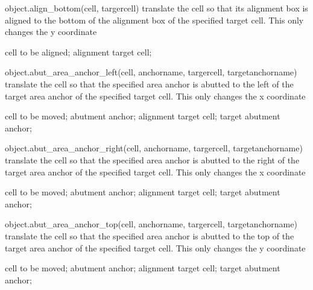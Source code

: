 \begin{APIfunc}{object.align\_bottom(cell, targercell)}
    translate the cell so that its alignment box is aligned to the bottom of the alignment box of the specified target cell. This only changes the y coordinate
    \begin{APIparameters}
            cell to be aligned;
            alignment target cell;
    \end{APIparameters}
\end{APIfunc}
\begin{APIfunc}{object.abut\_area\_anchor\_left(cell, anchorname, targercell, targetanchorname)}
    translate the cell so that the specified area anchor is abutted to the left of the target area anchor of the specified target cell. This only changes the x coordinate
    \begin{APIparameters}
            cell to be moved;
            abutment anchor;
            alignment target cell;
            target abutment anchor;
    \end{APIparameters}
\end{APIfunc}
\begin{APIfunc}{object.abut\_area\_anchor\_right(cell, anchorname, targercell, targetanchorname)}
    translate the cell so that the specified area anchor is abutted to the right of the target area anchor of the specified target cell. This only changes the x coordinate
    \begin{APIparameters}
            cell to be moved;
            abutment anchor;
            alignment target cell;
            target abutment anchor;
    \end{APIparameters}
\end{APIfunc}
\begin{APIfunc}{object.abut\_area\_anchor\_top(cell, anchorname, targercell, targetanchorname)}
    translate the cell so that the specified area anchor is abutted to the top of the target area anchor of the specified target cell. This only changes the y coordinate
    \begin{APIparameters}
            cell to be moved;
            abutment anchor;
            alignment target cell;
            target abutment anchor;
    \end{APIparameters}
\end{APIfunc}
